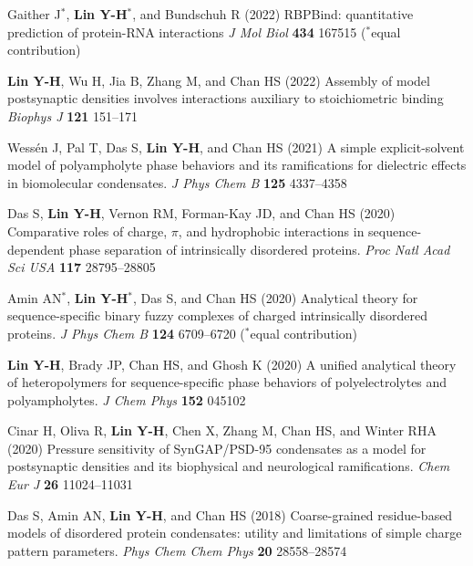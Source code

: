 \documentclass[11pt]{../yhlcv}
\def\tname#1{{\bf #1}}
\begin{document}
\begin{etaremune}[leftmargin=0.26in]\itemsep-0.2pt

\item
Gaither J$^*$, \tname{Lin Y-H}$^*$, and Bundschuh R (2022)
RBPBind: quantitative prediction of protein-RNA interactions
{\it J Mol Biol} {\bf 434} 167515
($^*$equal contribution)

\item 
\tname{Lin Y-H}, Wu H, Jia B, Zhang M, and Chan HS (2022)
Assembly of model postsynaptic densities involves interactions auxiliary to stoichiometric binding
{\it Biophys J} {\bf 121} 151--171

\item 
Wessén J, Pal T, Das S, \tname{Lin Y-H}, and Chan HS (2021)
A simple explicit-solvent model of polyampholyte phase behaviors and its ramifications for dielectric effects in biomolecular condensates.
{\it J Phys Chem B} {\bf 125} 4337--4358 %

\item 
Das S, \tname{Lin Y-H}, Vernon RM, Forman-Kay JD, and Chan HS (2020)
Comparative roles of charge, $\pi$, and hydrophobic interactions in sequence-dependent phase separation of intrinsically disordered proteins.
{\it Proc Natl Acad Sci USA} {\bf 117} 28795--28805

\item 
Amin AN$^*$, \tname{Lin Y-H}$^*$, Das S, and Chan HS (2020)
Analytical theory for sequence-specific binary fuzzy complexes of charged intrinsically disordered proteins.
{\it J Phys Chem B} 
{\bf 124} 6709--6720
($^*$equal contribution) %

\item
\tname{Lin Y-H}, Brady JP, Chan HS, and Ghosh K (2020)
A unified analytical theory of heteropolymers for sequence-specific phase behaviors of polyelectrolytes and polyampholytes. 
{\it J Chem Phys} {\bf 152} 045102

\item
Cinar H, Oliva R, \tname{Lin Y-H}, Chen X, Zhang M, Chan HS, and Winter RHA (2020)
Pressure sensitivity of SynGAP/PSD-95 condensates as a model for postsynaptic densities and its biophysical and neurological ramifications. 
{\it Chem Eur J} {\bf 26} 11024--11031 %

\item 
Das S, Amin AN, \tname{Lin Y-H}, and Chan HS (2018)
Coarse-grained residue-based models of disordered protein condensates: 
utility and limitations of simple charge pattern parameters.
{\it Phys Chem Chem Phys} {\bf 20} 28558--28574 


\end{etaremune}
\end{document}
